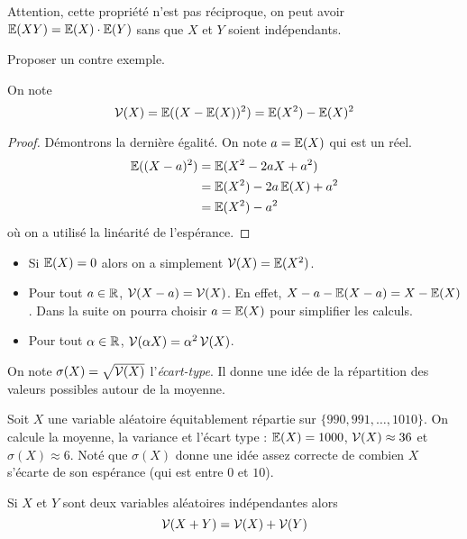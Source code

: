 Attention, cette propriété n'est pas réciproque, on peut avoir $\operatorname{\mathbb E}(XY) = \operatorname{\mathbb E}(X) \cdot \operatorname{\mathbb E}(Y)$ sans que $X$ et $Y$ soient indépendants.

\begin{exo}
Proposer un contre exemple.
\end{exo}


\begin{dfn}[Variance]
On note
$$\operatorname{\mathcal V}(X) = \operatorname{\mathbb E}((X - \operatorname{\mathbb E}(X))^2) = \operatorname{\mathbb E}(X^2) - \operatorname{\mathbb E}(X)^2$$
\end{dfn}

\begin{proof}
Démontrons la dernière égalité. On note $a = \operatorname{\mathbb E}(X)$ qui est un réel.
\begin{align*}
\operatorname{\mathbb E}((X - a)^2) & = \operatorname{\mathbb E}(X^2 - 2aX + a^2) \\
& = \operatorname{\mathbb E}(X^2) - 2a\operatorname{\mathbb E}(X) + a^2 \\
& = \operatorname{\mathbb E}(X^2) - a^2
\end{align*}
où on a utilisé la linéarité de l'espérance.
\end{proof}

\begin{rem}
\begin{itemize}
\item Si $\operatorname{\mathbb E}(X) = 0$ alors on a simplement $\operatorname{\mathcal V}(X) = \operatorname{\mathbb E}(X^2)$.
\item Pour tout $a\in\mathbb R$, $\operatorname{\mathcal V}(X - a) = \operatorname{\mathcal V}(X)$. En effet, $X - a - \operatorname{\mathbb E}(X - a) = X - \operatorname{\mathbb E}(X)$. Dans la suite on pourra choisir $a = \operatorname{\mathbb E}(X)$ pour simplifier les calculs.
\item Pour tout $\alpha\in\mathbb R$, $\operatorname{\mathcal V}(\alpha X) = \alpha^2\operatorname{\mathcal V}(X)$.
\end{itemize}
On note $\sigma(X) = \sqrt{\operatorname{\mathcal V}(X)}$ l'\textit{écart-type}. Il donne une idée de la répartition des valeurs possibles autour de la moyenne.
\end{rem}


\begin{ex}
Soit $X$ une variable aléatoire équitablement répartie sur $\{990, 991, \dots, 1010\}$. On calcule la moyenne, la variance et l'écart type : $\operatorname{\mathbb E}(X) = 1000$, $\operatorname{\mathcal V}(X)\approx 36$ et $\sigma(X)\approx 6$. Noté que $\sigma(X)$ donne une idée assez correcte de combien $X$ s'écarte de son espérance
(qui est entre $0$ et $10$).
\end{ex}


\begin{pro}
Si $X$ et $Y$ sont deux variables aléatoires indépendantes alors
$$\operatorname{\mathcal V}(X + Y) = \operatorname{\mathcal V}(X) + \operatorname{\mathcal V}(Y)$$
\end{pro}

